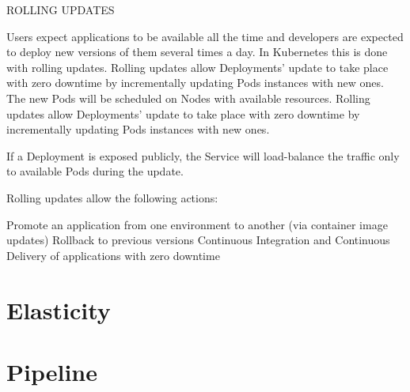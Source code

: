 ROLLING UPDATES

Users expect applications to be available all the time and developers are expected to deploy new versions of them several times a day. In Kubernetes this is done with rolling updates. Rolling updates allow Deployments' update to take place with zero downtime by incrementally updating Pods instances with new ones. The new Pods will be scheduled on Nodes with available resources.
Rolling updates allow Deployments' update to take place with zero downtime by incrementally updating Pods instances with new ones.

If a Deployment is exposed publicly, the Service will load-balance the traffic only to available Pods during the update.

Rolling updates allow the following actions:

Promote an application from one environment to another (via container image updates)
Rollback to previous versions
Continuous Integration and Continuous Delivery of applications with zero downtime


\section{Elasticity}
\label{sec:kubernetes-elasticity}

\lipsum[1]


\section{Pipeline}
\label{sec:openshift-pipeline}

\lipsum[1]